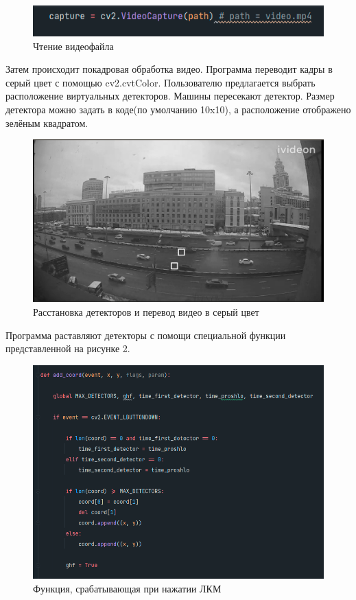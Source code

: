 \documentclass[a4paper,12pt]{article}
\begin{document}
\begin{figure}[h!]
  \begin{center}
      \includegraphics[width=0.8\linewidth]{openfile}
      \caption{Чтение видеофайла} 
      \label{} 
  \end{center} 
\end{figure}

Затем происходит покадровая обработка видео. Программа переводит кадры в серый цвет с помощью cv2.cvtColor.
Пользователю предлагается выбрать расположение виртуальных детекторов. Машины пересекают детектор. Размер детектора можно задать в коде(по умолчанию 10x10), а расположение отображено зелёным квадратом.

\begin{figure}[h!]
  \begin{center}
      \includegraphics[width=0.8\linewidth]{detectors}
      \caption{Расстановка детекторов и перевод видео в серый цвет} 
      \label{} 
  \end{center} 
\end{figure}

Программа раставляют детекторы с помощи специальной функции представленной на рисунке 2.

\begin{figure}[h!]
  \begin{center}
      \includegraphics[width=0.8\linewidth]{callback}
      \caption{Функция, срабатывающая при нажатии ЛКМ} 
      \label{} 
  \end{center} 
\end{figure}
\end{document}
